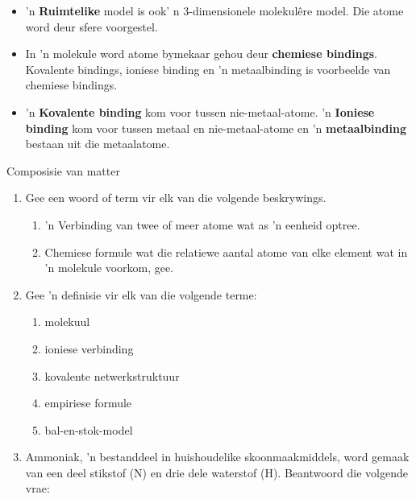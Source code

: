 \begin{itemize}[noitemsep]
\label{m38120*uid76}\item 'n \textbf{Ruimtelike} model is ook' n 3-dimensionele molekulêre model. Die atome word deur sfere voorgestel.
\label{m38120*uid77}\item In 'n molekule word atome bymekaar gehou deur \textbf{chemiese bindings}. Kovalente bindings, ioniese binding en 'n metaalbinding is voorbeelde van chemiese bindings.
\label{m38120*uid78}\item 'n \textbf{Kovalente binding} kom voor tussen nie-metaal-atome. 'n \textbf{Ioniese binding} kom voor tussen metaal en nie-metaal-atome en 'n \textbf{metaalbinding} bestaan uit die metaalatome.
\end{itemize}
\label{m38120*secfhsst!!!underscore!!!id497}
            \begin{eocexercises}{Composisie van matter}
            \nopagebreak
            \label{m38120*id311490}\begin{enumerate}[noitemsep, label=\textbf{\arabic*}. ] 
            \label{m38120*uid87}\item Gee een woord of term vir elk van die volgende beskrywings.
\label{m38120*id34411506}\begin{enumerate}[noitemsep, label=\textbf{\alph*}. ] 
            \label{m38120*uid90}\item 'n Verbinding van twee of meer atome wat as 'n eenheid optree.
\label{m38120*uid9221}\item Chemiese formule wat die relatiewe aantal atome van elke element wat in 'n molekule voorkom, gee.
\end{enumerate}
\label{m38120*uid227}\item Gee 'n definisie vir elk van die volgende terme: 
\label{m38120*id311506}\begin{enumerate}[noitemsep, label=\textbf{\alph*}. ] 
            \label{m38120*uid930}\item molekuul
\label{m38120*uid91}\item ioniese verbinding
\item kovalente netwerkstruktuur
\item empiriese formule
\item bal-en-stok-model\end{enumerate}
\label{m38120*uid92}\item Ammoniak, 'n bestanddeel in huishoudelike skoonmaakmiddels, word gemaak van een deel stikstof ($\text{N}$) en drie dele waterstof ($\text{H}$). Beantwoord die volgende vrae:
\label{m38120*id311590}\begin{enumerate}[noitemsep, label=\textbf{\alph*}. ] 

\end{enumerate}
\end{enumerate}
\end{eocexercises}
